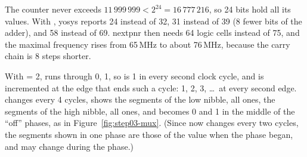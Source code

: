 \solution
The counter never exceeds $11\,999\,999 < 2^{24} = 16\,777\,216$, so 24 bits
hold all its values. With , yosys reports 24 
instead of 32, 31  instead of 39 (8 fewer bits of the adder),
and 58  instead of 69. nextpnr then needs 64 logic cells instead of
75, and the maximal frequency rises from 65\,MHz to about 76\,MHz, because the
carry chain is 8 steps shorter.

\solution
With  = 2,  runs through 0, 1, so 
is 1 in every second clock cycle, and  is incremented at the edge
that ends such a cycle: 1, 2, 3, \dots\ at every second edge.
 changes every 4 cycles,  shows the segments
of the low nibble, all ones, the segments of the high nibble, all ones, and
 becomes 0 and 1 in the middle of the ``off'' phases, as in
Figure~\ref{fig:step03-mux}. (Since  now changes every two
cycles, the segments shown in one phase are those of the value when the phase
began, and may change during the phase.)

